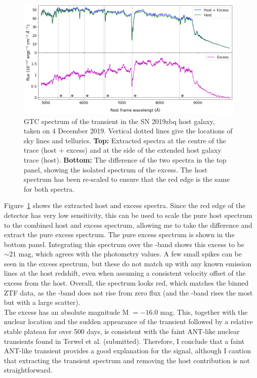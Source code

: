 \documentclass[a4paper,oneside,12pt, class=Latex/Classes/PhDthesisPSnPDF, crop=false]{standalone}
\begin{document}
\begin{figure}
    \centering
    \includegraphics[width=\textwidth]{../Images/chapter_5/2020zbq_spec.png}
    \caption{GTC spectrum of the transient in the SN 2019zbq host galaxy, taken on 4 December 2019. Vertical dotted lines give the locations of sky lines and tellurics. \textbf{Top:} Extracted spectra at the centre of the trace (host + excess) and at the side of the extended host galaxy trace (host). \textbf{Bottom:} The difference of the two spectra in the top panel, showing the isolated spectrum of the excess. The host spectrum has been re-scaled to ensure that the red edge is the same for both spectra.}
    \label{2019zbq_spec}
\end{figure}

Figure~\ref{2019zbq_spec} shows the extracted host and excess spectra. Since the red edge of the detector has very low sensitivity, this can be used to scale the pure host spectrum to the combined host and excess spectrum, allowing me to take the difference and extract the pure excess spectrum. The pure excess spectrum is shown in the bottom panel. Integrating this spectrum over the \ztfr-band shows this excess to be $\sim21$ mag, which agrees with the photometry values. A few small spikes can be seen in the excess spectrum, but these do not match up with any known emission lines at the host redshift, even when assuming a consistent velocity offset of the excess from the host. Overall, the spectrum looks red, which matches the binned ZTF data, as the \ztfg-band does not rise from zero flux (and the \ztfi-band rises the most but with a large scatter).\\

The excess has an absolute magnitude M $=-16.0$ mag. This, together with the nuclear location and the sudden appearance of the transient followed by a relative stable plateau for over 500 days, is consistent with the faint ANT-like nuclear transients found in Terwel et al. (submitted). Therefore, I conclude that a faint ANT-like transient provides a good explanation for the signal, although I caution that extracting the transient spectrum and removing the host contribution is not straightforward.
\end{document}
